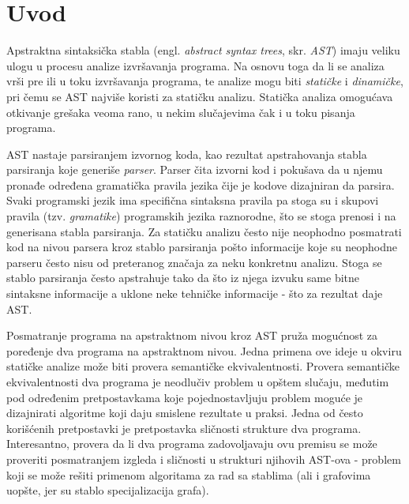 \chapter{Uvod}
\label{chp:Intro}

Apstraktna sintaksička stabla (engl. \emph{abstract syntax trees}, skr. \emph{AST}) imaju veliku ulogu u procesu analize izvršavanja programa. Na osnovu toga da li se analiza vrši pre ili u toku izvršavanja programa, te analize mogu biti \emph{statičke} i \emph{dinamičke}, pri čemu se AST najviše koristi za statičku analizu. Statička analiza omogućava otkivanje grešaka veoma rano, u nekim slučajevima čak i u toku pisanja programa. 

AST nastaje parsiranjem izvornog koda, kao rezultat apstrahovanja stabla parsiranja koje generiše \emph{parser}. Parser čita izvorni kod i pokušava da u njemu pronađe određena gramatička pravila jezika čije je kodove dizajniran da parsira. Svaki programski jezik ima specifična sintaksna pravila pa stoga su i skupovi pravila (tzv. \emph{gramatike}) programskih jezika raznorodne, što se stoga prenosi i na generisana stabla parsiranja. Za statičku analizu često nije neophodno posmatrati kod na nivou parsera kroz stablo parsiranja pošto informacije koje su neophodne parseru često nisu od preteranog značaja za neku konkretnu analizu. Stoga se stablo parsiranja često apstrahuje tako da što iz njega izvuku same bitne sintaksne informacije a uklone neke tehničke informacije - što za rezultat daje AST.

Posmatranje programa na apstraktnom nivou kroz AST pruža mogućnost za poređenje dva programa na apstraktnom nivou. Jedna primena ove ideje u okviru statičke analize može biti provera semantičke ekvivalentnosti. Provera semantičke ekvivalentnosti dva programa je neodlučiv problem u opštem slučaju, međutim pod određenim pretpostavkama koje pojednostavljuju problem moguće je dizajnirati algoritme koji daju smislene rezultate u praksi. Jedna od često korišćenih pretpostavki je pretpostavka sličnosti strukture dva programa. Interesantno, provera da li dva programa zadovoljavaju ovu premisu se može proveriti posmatranjem izgleda i sličnosti u strukturi njihovih AST-ova - problem koji se može rešiti primenom algoritama za rad sa stablima (ali i grafovima uopšte, jer su stablo specijalizacija grafa).

